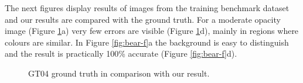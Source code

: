 The next figures display results of images from the training benchmark dataset and our results are compared with the ground truth. For a moderate opacity image (Figure \ref{fig:trolls-f}a) very few errors are visible (Figure \ref{fig:trolls-f}d), mainly in regions where colours are similar. In Figure \ref{fig:bear-f}a the background is easy to distinguish and the result is practically 100\% accurate (Figure \ref{fig:bear-f}d).

\begin{figure}[t!]
\centering
{}
\newline
{}
\caption[GT04 benchmark image with various results.]{GT04 ground truth in comparison with our result.}
\label{fig:trolls-f}
\end{figure}


